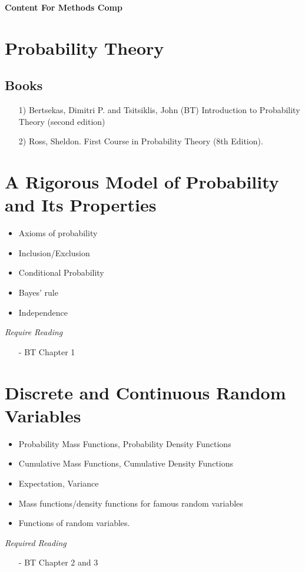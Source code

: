 \documentclass{article}
\begin{document}
\textbf{\huge{Content For Methods Comp}}

\section*{Probability Theory}


\subsection*{Books}
\begin{itemize}
\item[1)]  Bertsekas, Dimitri P. and Tsitsiklis, John (BT) Introduction to Probability Theory (second edition)
\item[2)] Ross, Sheldon.  First Course in Probability Theory (8th Edition).  
\end{itemize}




\section{A Rigorous Model of Probability and Its Properties}
\begin{itemize}
\item Axioms of probability
\item Inclusion/Exclusion
\item Conditional Probability
\item Bayes' rule
\item Independence 
\end{itemize}
\textit{Require Reading}
\begin{itemize}
\item[-] BT Chapter 1 
\end{itemize}



\section{Discrete  and Continuous Random Variables}
\begin{itemize}
\item Probability Mass Functions, Probability Density Functions
\item Cumulative Mass Functions, Cumulative Density Functions
\item Expectation, Variance
\item Mass functions/density functions for famous random variables
\item Functions of random variables. 
\end{itemize}
\textit{Required Reading}
\begin{itemize}
\item[-] BT Chapter 2 and 3
\end{itemize}
\end{document}
